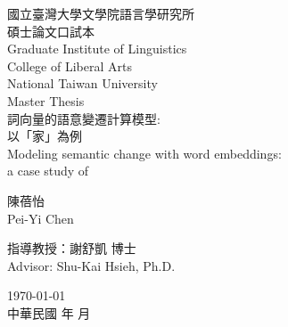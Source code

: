 \begin{titlepage}
    \begin{center}
        \titlepagestyle
        國立臺灣大學文學院語言學研究所\\
        碩士論文口試本\\
        \vspace{.3cm}
        \fontsize{14}{14}\selectfont
        \linespread{1.5}
        Graduate Institute of Linguistics\\
        College of Liberal Arts\\
        \vspace{.3cm}
        \fontsize{16}{16}\selectfont
        \linespread{1.5}
        National Taiwan University\\
        Master Thesis\\

        \vspace{1.5cm}
        \titlepagestyle
        詞向量的語意變遷計算模型:\\
        以「家」為例\\
        Modeling semantic change with word embeddings:\\
        a case study of \jia

        \vspace{2.5cm}
        陳蓓怡\\
        Pei-Yi Chen

        \vspace{1cm}
        指導教授：謝舒凱 博士\\
        Advisor: Shu-Kai Hsieh, Ph.D.
            
        \vspace{1cm}
        \monthyearEN\today\\
        中華民國 \yearZH 年 \the\month 月
    \end{center}
    \restoregeometry
\end{titlepage}